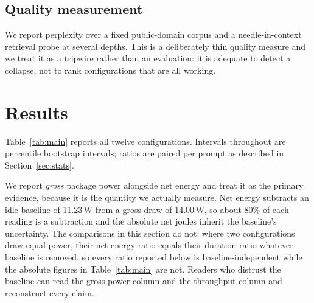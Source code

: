 \documentclass[journal]{IEEEtran}
\begin{document}
\subsection{Quality measurement}
We report perplexity over a fixed public-domain corpus and a needle-in-context
retrieval probe at several depths. This is a deliberately thin quality measure
and we treat it as a tripwire rather than an evaluation: it is adequate to
detect a collapse, not to rank configurations that are all working.

\section{Results}
\label{sec:results}

Table~\ref{tab:main} reports all twelve configurations. Intervals throughout
are percentile bootstrap intervals; ratios are paired per prompt as described
in Section~\ref{sec:stats}.

We report \emph{gross} package power alongside net energy and treat it as the
primary evidence, because it is the quantity we actually measure. Net energy
subtracts an idle baseline of 11.23\,W from a gross draw of 14.00\,W, so about
80\% of each reading is a subtraction and the absolute net joules inherit the
baseline's uncertainty. The comparisons in this section do not: where two
configurations draw equal power, their net energy ratio equals their duration
ratio whatever baseline is removed, so every ratio reported below is
baseline-independent while the absolute figures in Table~\ref{tab:main} are
not. Readers who distrust the baseline can read the gross-power column and the
throughput column and reconstruct every claim.
\end{document}
